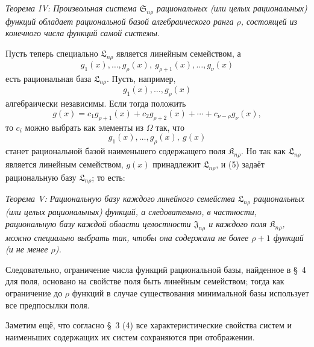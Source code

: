 \documentclass[11pt]{article}
\providecommand{\Kfield}{\mathfrak{K}}
\providecommand{\Ssys}{\mathfrak{S}}
\providecommand{\Jdom}{\mathfrak{J}}
\providecommand{\Lsys}{\mathfrak{L}}
\begin{document}
\emph{Теорема IV: Произвольная система $\Ssys_{n\rho}$ рациональных (или целых рациональных) функций обладает рациональной базой алгебраического ранга $\rho$, состоящей из конечного числа функций самой системы.}

Пусть теперь специально $\Lsys_{n\rho}$ является линейным семейством, а
\begin{equation}
  g_1(x),\ldots,g_\rho(x),\ g_{\rho+1}(x),\ldots,g_\nu(x)
\tag{4}
\end{equation}
есть рациональная база $\Lsys_{n\rho}$. Пусть, например,
\[
  g_1(x),\ldots,g_\rho(x)
\]
алгебраически независимы. Если тогда положить
\[
  g(x)=c_1g_{\rho+1}(x)+c_2g_{\rho+2}(x)+\cdots+c_{\nu-\rho}g_\nu(x),
\]
то $c_i$ можно выбрать как элементы из $\Omega$ так, что
\begin{equation}
  g_1(x),\ldots,g_\rho(x),\ g(x)
\tag{5}
\end{equation}
станет рациональной базой наименьшего содержащего поля $\Kfield_{n\rho}$. Но так как $\Lsys_{n\rho}$ является линейным семейством, $g(x)$ принадлежит $\Lsys_{n\rho}$, и (5) задаёт рациональную базу $\Lsys_{n\rho}$; то есть:

\emph{Теорема V: Рациональную базу каждого линейного семейства $\Lsys_{n\rho}$ рациональных (или целых рациональных) функций, а следовательно, в частности, рациональную базу каждой области целостности $\Jdom_{n\rho}$ и каждого поля $\Kfield_{n\rho}$, можно специально выбрать так, чтобы она содержала не более $\rho+1$ функций (и не менее $\rho$).}

Следовательно, ограничение числа функций рациональной базы, найденное в \S\ 4 для поля, основано на свойстве поля быть линейным семейством; тогда как ограничение до $\rho$ функций в случае существования минимальной базы использует все предпосылки поля.

Заметим ещё, что согласно \S\ 3 (4) все характеристические свойства систем и наименьших содержащих их систем сохраняются при отображении.
\end{document}
